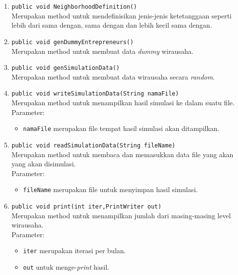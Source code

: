 \begin{enumerate}
			\item \texttt{public void NeighborhoodDefinition()}\\
			Merupakan method untuk mendefinisikan jenis-jenis ketetanggaan seperti lebih dari sama dengan, sama dengan dan lebih kecil sama dengan.\\
			
			\item \texttt{public void genDummyEntrepreneurs()}\\
			Merupakan method untuk membuat data \textit{dummy} wirausaha.
			
			\item \texttt{public void genSimulationData()}\\
			Merupakan method untuk membuat data wirausaha secara \textit{random}.
			
			\item \texttt{public void writeSimulationData(String namaFile)}\\
			Merupakan method untuk menampilkan hasil simulasi ke dalam suatu file.\\
			Parameter:
			\begin{itemize}
				\item \texttt{namaFile} merupakan file tempat hasil simulasi akan ditampilkan.
			\end{itemize}
			
			\item \texttt{public void readSimulationData(String fileName)}\\
			Merupakan method untuk membaca dan memasukkan data file yang akan yang akan disimulasi.\\
			Parameter:
				\begin{itemize}
				\item \texttt{fileName} merupakan file untuk menyimpan hasil simulasi.
			\end{itemize}
			
			\item \texttt{public void print(int iter,PrintWriter out)}\\
			Merupakan method untuk menampilkan jumlah dari masing-masing level wirausaha.\\
			Parameter:
			\begin{itemize}
				\item \texttt{iter} merupakan iterasi per bulan.
				\item \texttt{out} untuk menge-\textit{print} hasil.
			\end{itemize}
			

\end{enumerate}
